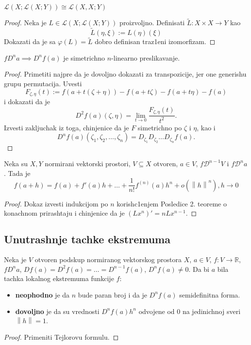 \documentclass[a4paper,12pt]{article}
\newcommand{\R}{\mathbb{R}}
\newcommand{\psj}{\subseteq}
\newcommand{\norm}[1]{\left\lVert#1\right\rVert}
\begin{document}
\begin{tvr}
$\mathcal{L} (X; \mathcal{L}(X;Y)) \cong \mathcal{L} (X,X; Y)$
\end{tvr}
\begin{proof}
Neka je $L \in \mathcal{L} (X; \mathcal{L}(X;Y))$ proizvoljno. Definisati $\tilde{L} : X \times X \to Y$ kao \[\tilde{L} (\eta, \xi) := L(\eta)(\xi)\]
Dokazati da je sa $\varphi(L) = \tilde{L}$ dobro definisan traz1eni izomorfizam.
\end{proof}

\begin{tvr}
	$fD^n a \implies D^nf(a)$ je simetrichno $n$-linearno preslikavanje.
\end{tvr}
\begin{proof}
	Primetiti najpre da je dovoljno dokazati za transpozicije, jer one generishu grupu permutacija.
	Uvesti \[F_{\zeta, \eta} (t) := f(a +t(\zeta + \eta)) - f(a + t\zeta) - f(a + t\eta) - f(a)\] i 
	dokazati da je \[ D^2f(a)(\zeta, \eta) = \lim_{t\to 0} \dfrac{F_{\zeta, \eta} (t)}{t^2} .\] 
	Izvesti zakljuchak iz toga, chinjenice da je $F$ simetrichno po $\zeta$ i $\eta$, kao i 
	\[ D^nf(a) (\zeta_1, \zeta_2, \dotso, \zeta_n) = D_{\zeta_1}D_{\zeta_2}\dotso D_{\zeta_n} f(a).\]
\end{proof}

\begin{tma}
Neka su $X, Y$ normirani vektorski prostori, $V \psj X$ otvoren, $a \in V$, $f \mathcal{D}^{n-1}V$ i $f\mathcal{D}^n a$. Tada je 
\[f(a+h) = f(a) + f'(a)h + \dots + \frac{1}{n!} f^{(n)}(a) h^n + o(\norm{h}^n), h \to 0\]
\end{tma}
\begin{proof}
Dokaz izvesti indukcijom po $n$ korish\-c1e\-njem Posledice 2. teoreme o konachnom prirashtaju i chinjenice da je $(Lx^n)' = n Lx^{n-1}$.
\end{proof}

\subsection{Unutrashnje tachke ekstremuma}

\begin{tvr}
	Neka je $V$ otvoren podskup normiranog vektorskog prostora $X$, $a \in V$, $f:V\to \R$, $f D^n a$,
	$Df(a) = D^2f(a) = \dotso = D^{n-1}f(a)$, $D^n f(a) \neq 0 $. Da bi $a$ bila tachka lokalnog ekstremuma
    funkcije $f$:
	\begin{itemize}
		\item \textbf{neophodno} je da $n$ bude paran broj i da je $D^nf(a)$ semidefinitna forma.
		\item \textbf{dovoljno} je da su vrednosti $D^nf(a)h^n$ odvojene od $0$ na jedinichnoj sveri $\norm h = 1$.
	\end{itemize}
\end{tvr}
\begin{proof}
	Primeniti Tejlorovu formulu.
\end{proof}
\end{document}
